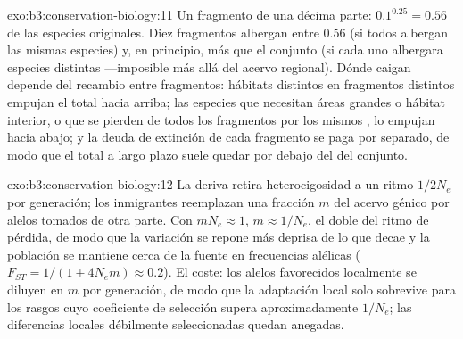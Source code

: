 \begin{solution}{exo:b3:conservation-biology:11}
Un fragmento de una décima parte: $0.1^{0.25} = 0.56$ de las especies
originales. Diez fragmentos albergan entre $0.56$ (si todos albergan
las mismas especies) y, en principio, más que el conjunto (si cada uno
albergara especies distintas ---imposible más allá del acervo
regional). Dónde caigan depende del recambio entre fragmentos: hábitats
distintos en fragmentos distintos empujan el total hacia arriba; las
especies que necesitan áreas grandes o hábitat interior, o que se
pierden de todos los fragmentos por los mismos , lo
empujan hacia abajo; y la deuda de extinción de cada fragmento se paga
por separado, de modo que el total a largo plazo suele quedar por
debajo del del conjunto.
\end{solution}

\begin{solution}{exo:b3:conservation-biology:12}
La deriva retira heterocigosidad a un ritmo $1/2N_{e}$ por generación;
los inmigrantes reemplazan una fracción $m$ del acervo génico por
alelos tomados de otra parte. Con $mN_{e} \approx 1$, $m \approx 1/N_{e}$,
el doble del ritmo de pérdida, de modo que la variación se repone más
deprisa de lo que decae y la población se mantiene cerca de la fuente
en frecuencias alélicas ($F_{ST} = 1/(1
+ 4N_{e}m) \approx 0.2$). El coste: los alelos favorecidos localmente
se diluyen en $m$ por generación, de modo que la adaptación local solo
sobrevive para los rasgos cuyo coeficiente de selección supera
aproximadamente $1/N_{e}$; las diferencias locales débilmente
seleccionadas quedan anegadas.
\end{solution}

